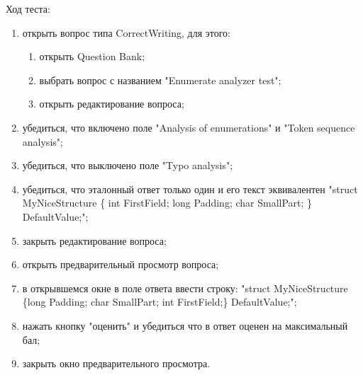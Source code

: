 \documentclass[a4paper,english]{G2-105}
\begin{document}
\par Ход теста: 
\begin{enumerate}
    \item открыть вопрос типа CorrectWriting, для этого:
        \begin{enumerate}
            \item открыть Question Bank;
            \item выбрать вопрос с названием "Enumerate analyzer test";
            \item открыть редактирование вопроса;
        \end{enumerate}
    \item убедиться, что включено поле "Analysis of enumerations" и "Token sequence analysis";
    \item убедиться, что выключено поле "Typo analysis";
    \item убедиться, что эталонный ответ только один и его текст эквивалентен "struct  MyNiceStructure \{ int  FirstField;  long Padding;  char  SmallPart; \} DefaultValue;";
    \item закрыть редактирование вопроса;
    \item открыть предварительный просмотр вопроса;
    \item в открывшемся окне в поле ответа ввести строку: "struct MyNiceStructure \{long Padding; char SmallPart; int FirstField;\} DefaultValue;";
    \item нажать кнопку "оценить" и убедиться что в ответ оценен на максимальный бал;
    \item закрыть окно предварительного просмотра.
\end{enumerate}
\end{document}
